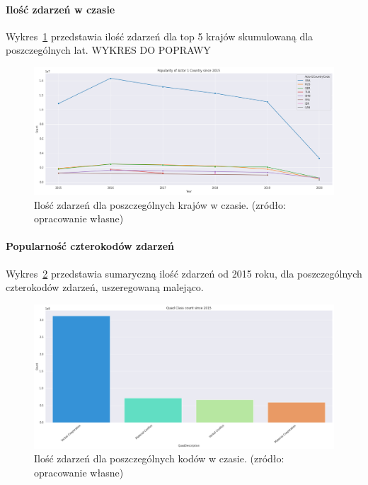 \documentclass[11pt]{report}
\begin{document}
    \paragraph{Ilość zdarzeń w czasie}
    Wykres~\ref{fig:GLOBALactor1inTime} przedstawia ilość zdarzeń dla top 5 krajów skumulowaną dla poszczególnych lat.
    WYKRES DO POPRAWY
    \begin{figure}[ht]
        \centering
        \includegraphics[width=1 \textwidth]{fig/GLOBAL/Actor1inTIME.png}
        \caption{Ilość zdarzeń dla poszczególnych krajów w czasie. (zródło: opracowanie własne)}
        \label{fig:GLOBALactor1inTime}
    \end{figure}

    \paragraph{Popularność czterokodów zdarzeń}
    Wykres~\ref{fig:GLOBALQC} przedstawia sumaryczną ilość zdarzeń od 2015 roku, dla poszczególnych czterokodów zdarzeń, uszeregowaną malejąco.
    \begin{figure}[ht]
        \centering
        \includegraphics[width=1 \textwidth]{fig/GLOBAL/QC.png}
        \caption{Ilość zdarzeń dla poszczególnych kodów w czasie. (zródło: opracowanie własne)}
        \label{fig:GLOBALQC}
    \end{figure}
\end{document}
